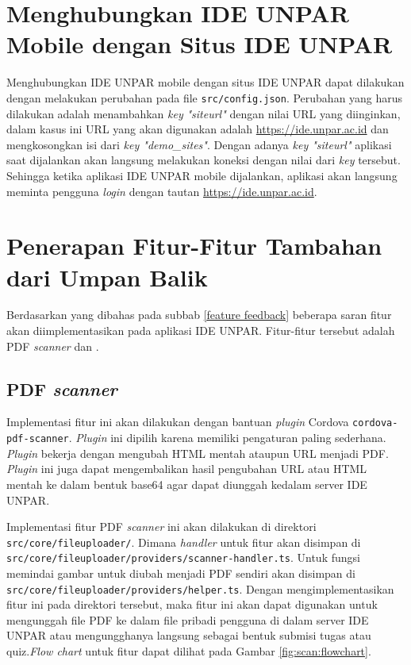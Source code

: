 \section{Menghubungkan IDE UNPAR Mobile dengan Situs IDE UNPAR}
\label{mobile:connect}
Menghubungkan IDE UNPAR mobile dengan situs IDE UNPAR dapat dilakukan dengan melakukan perubahan pada file \texttt{src/config.json}.  Perubahan yang harus dilakukan adalah menambahkan \textit{key} \textit{"siteurl"} dengan nilai URL yang diinginkan, dalam kasus ini URL yang akan digunakan adalah \url{https://ide.unpar.ac.id} dan mengkosongkan isi dari \textit{key "demo\_sites"}. Dengan adanya \textit{key "siteurl"} aplikasi saat dijalankan akan langsung melakukan koneksi dengan nilai dari \textit{key} tersebut. Sehingga ketika aplikasi IDE UNPAR mobile dijalankan, aplikasi akan langsung meminta pengguna \textit{login} dengan tautan \url{https://ide.unpar.ac.id}. 

\section{Penerapan Fitur-Fitur Tambahan dari Umpan Balik}
\label{feat:feedback}

Berdasarkan yang dibahas pada subbab \ref{feature feedback} beberapa saran fitur akan diimplementasikan pada aplikasi IDE UNPAR. Fitur-fitur tersebut adalah PDF \textit{scanner} dan .

\subsection{PDF \textit{scanner}}
\label{feat:pdfscan}
Implementasi fitur ini akan dilakukan dengan bantuan \textit{plugin} Cordova \texttt{cordova-pdf-scanner}. \textit{Plugin} ini dipilih karena memiliki pengaturan paling sederhana. \textit{Plugin} bekerja dengan mengubah HTML mentah ataupun URL menjadi PDF. \textit{Plugin} ini juga dapat mengembalikan hasil pengubahan URL atau HTML mentah ke dalam bentuk base64 agar dapat diunggah kedalam server IDE UNPAR. 

Implementasi fitur PDF \textit{scanner} ini akan dilakukan di direktori \texttt{src/core/fileuploader/}. Dimana \textit{handler} untuk fitur akan disimpan di \texttt{src/core/fileuploader/providers/scanner-handler.ts}. Untuk fungsi memindai gambar untuk diubah menjadi PDF sendiri akan disimpan di \\ \texttt{src/core/fileuploader/providers/helper.ts}. Dengan mengimplementasikan fitur ini pada direktori tersebut, maka fitur ini akan dapat digunakan untuk mengunggah file PDF ke dalam file pribadi pengguna di dalam server IDE UNPAR atau mengungghanya langsung sebagai bentuk submisi tugas atau quiz.\textit{Flow chart} untuk fitur dapat dilihat pada Gambar \ref{fig:scan:flowchart}. 

